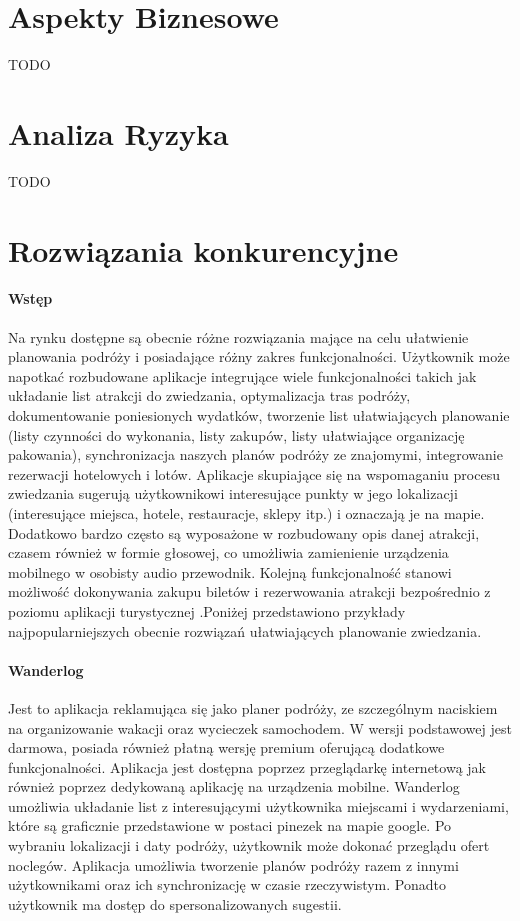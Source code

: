 \section{Aspekty Biznesowe}
\label{sec:aspekty-biznesowe}

TODO

\section{Analiza Ryzyka}
\label{sec:analiza-ryzyka}

TODO

\section{Rozwiązania konkurencyjne}
\label{sec:rozwiazania-konkurencyjne}

\paragraph{Wstęp}

Na rynku dostępne są obecnie różne rozwiązania mające na celu ułatwienie planowania podróży i posiadające różny zakres funkcjonalności.
Użytkownik może napotkać rozbudowane aplikacje integrujące wiele funkcjonalności takich jak układanie list atrakcji do zwiedzania,
optymalizacja tras podróży, dokumentowanie poniesionych wydatków, tworzenie list ułatwiających planowanie (listy czynności do wykonania,
listy zakupów, listy ułatwiające organizację pakowania), synchronizacja naszych planów podróży ze znajomymi, integrowanie rezerwacji hotelowych i lotów.
Aplikacje skupiające się na wspomaganiu procesu zwiedzania sugerują użytkownikowi interesujące punkty w jego lokalizacji (interesujące miejsca, hotele,
restauracje, sklepy itp.) i oznaczają je na mapie. Dodatkowo bardzo często są wyposażone w rozbudowany opis danej atrakcji, czasem również w formie
głosowej, co umożliwia zamienienie urządzenia mobilnego w osobisty audio przewodnik. Kolejną funkcjonalność stanowi możliwość dokonywania zakupu biletów
i rezerwowania atrakcji bezpośrednio z poziomu aplikacji turystycznej .Poniżej przedstawiono przykłady najpopularniejszych obecnie rozwiązań
ułatwiających planowanie zwiedzania.

\paragraph{Wanderlog}

Jest to aplikacja reklamująca się jako planer podróży, ze szczególnym naciskiem na organizowanie wakacji oraz wycieczek samochodem.
W wersji podstawowej jest darmowa, posiada również płatną wersję premium  oferującą dodatkowe funkcjonalności.
Aplikacja jest dostępna poprzez przeglądarkę internetową jak również poprzez dedykowaną aplikację na urządzenia mobilne.
Wanderlog umożliwia układanie list z interesującymi użytkownika miejscami i wydarzeniami, które są graficznie przedstawione w
postaci pinezek na mapie google. Po wybraniu lokalizacji i daty podróży, użytkownik może dokonać przeglądu ofert noclegów.
Aplikacja umożliwia tworzenie planów podróży razem z innymi użytkownikami oraz ich synchronizację w czasie rzeczywistym.
Ponadto użytkownik ma dostęp do spersonalizowanych sugestii.

